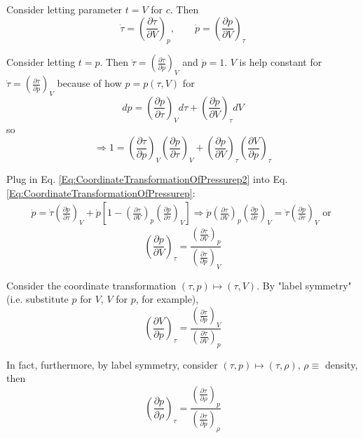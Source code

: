\documentclass[10pt]{amsart}
\begin{document}
\begin{multicols*}{2}
Consider letting parameter $t=V$ for $c$. Then
\[
\dot{\tau} = \left( \frac{ \partial \tau }{ \partial V } \right)_p, \qquad \dot{p} = \left( \frac{ \partial p }{ \partial V} \right)_{\tau}
\]

Consider letting $t=p$. Then $\dot{\tau} = \left( \frac{ \partial \tau}{ \partial p} \right)_V$ and $\dot{p} = 1$. $V$ is help constant for $\dot{\tau} = \left( \frac{ \partial \tau}{ \partial p} \right)_V$ because of how $p = p(\tau, V)$ for 
\[
dp = \left(\frac{ \partial p}{ \partial \tau} \right)_V d\tau + \left( \frac{ \partial p }{ \partial V} \right)_{\tau} dV
\]
so
\begin{equation}\label{Eq:CoordinateTransformationOfPressurep2}
\Longrightarrow 1 = \left( \frac{ \partial \tau }{ \partial p } \right)_V \left( \frac{ \partial p }{ \partial \tau } \right)_V + \left( \frac{ \partial p }{ \partial V } \right)_{\tau} \left( \frac{ \partial V }{ \partial p } \right)_{\tau}
\end{equation}

Plug in Eq. \ref{Eq:CoordinateTransformationOfPressurep2} into Eq. \ref{Eq:CoordinateTransformationOfPressurep}:
\[
\begin{gathered}
	\dot{p} = \dot{\tau} \left( \frac{ \partial p}{ \partial \tau} \right)_V + \dot{p} \left[ 1 - \left( \frac{ \partial \tau}{ \partial V} \right)_p \left( \frac{\partial p}{ \partial \tau} \right)_V \right] \Longrightarrow \dot{p} \left( \frac{ \partial \tau }{ \partial V } \right)_p \left( \frac{ \partial p }{ \partial \tau } \right)_V = \dot{\tau} \left( \frac{ \partial p }{ \partial \tau } \right)_V \text{ or }
\end{gathered}
\]
\begin{equation}
\boxed{ \left( \frac{ \partial p }{ \partial V} \right)_{\tau} = \frac{\left( \frac{ \partial \tau }{ \partial V } \right)_p }{ \left( \frac{ \partial \tau }{ \partial p } \right)_V} }
\end{equation}

Consider the coordinate transformation $(\tau, p) \mapsto (\tau, V)$. By "label symmetry" (i.e. substitute $p$ for $V$, $V$ for $p$, for example),
\begin{equation}
\boxed{ \left( \frac{\partial V}{ \partial p } \right)_{\tau} = \frac{ \left( \frac{ \partial \tau }{ \partial p } \right)_V}{ \left( \frac{ \partial \tau }{ \partial V } \right)_p } }
\end{equation}

In fact, furthermore, by label symmetry, consider $(\tau, p) \mapsto (\tau, \rho)$, $\rho \equiv $ density, then
\begin{equation}
\boxed{ \left( \frac{\partial p}{ \partial \rho } \right)_{\tau} = \frac{ \left( \frac{ \partial \tau }{ \partial \rho } \right)_p}{ \left( \frac{ \partial \tau }{ \partial p } \right)_{\rho} } }
\end{equation}


\end{multicols*}
\end{document}
